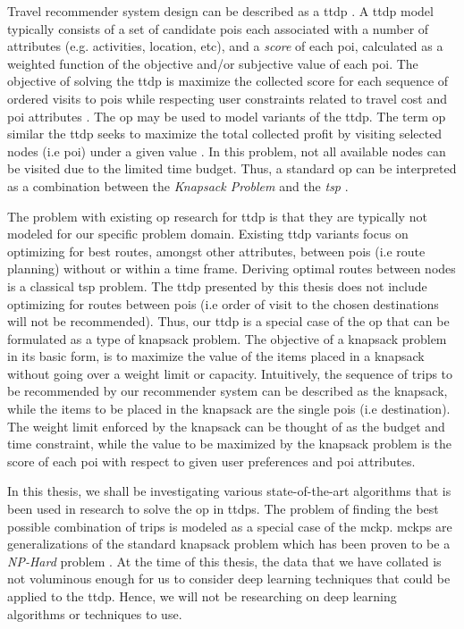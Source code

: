 Travel recommender system design can be described as a \gls{ttdp} \parencite{Vansteenwegen2007TheOpportunity}. A \gls{ttdp} model typically consists of a set of candidate \glspl{poi} each associated with a number of attributes (e.g. activities, location, etc), and a \textit{score} of each \gls{poi}, calculated as a weighted function of the objective and/or subjective value of each \gls{poi}. The objective of solving the \gls{ttdp} is maximize the collected score for each sequence of ordered visits to \glspl{poi} while respecting user constraints related to travel cost and \gls{poi} attributes \parencite{Survey_TTDP_Guavalas}. The \gls{op} may be used to model variants of the \gls{ttdp}. The term \gls{op} similar the \gls{ttdp} seeks to maximize the total collected profit by visiting selected nodes (i.e \gls{poi}) under a given value \parencite{T.1984HeuristicOrienteering}. In this problem, not all available nodes can be visited due to the limited time budget. Thus, a standard \gls{op} can be interpreted as a combination between the \textit{Knapsack Problem} and the \textit{tsp} \parencite{OP_Solution_Gunawan}. 

The problem with existing \gls{op} research for \gls{ttdp} is that they are typically not modeled for our specific problem domain. Existing \gls{ttdp} variants focus on optimizing for best routes, amongst other attributes, between \glspl{poi} (i.e route planning) without or within a time frame. Deriving optimal routes between nodes is a classical \gls{tsp} problem. The \gls{ttdp} presented by this thesis does not include optimizing for routes between \glspl{poi} (i.e order of visit to the chosen destinations will not be recommended). Thus, our \gls{ttdp} is a special case of the \gls{op} that can be formulated as a type of knapsack problem. The objective of a knapsack problem in its basic form, is to maximize the value of the items placed in a knapsack without going over a weight limit or capacity. Intuitively, the sequence of trips to be recommended by our recommender system can be described as the knapsack, while the items to be placed in the knapsack are the single \glspl{poi} (i.e destination). The weight limit enforced by the knapsack can be thought of as the budget and time constraint, while the value to be maximized by the knapsack problem is the score of each \gls{poi} with respect to given user preferences and \gls{poi} attributes.

In this thesis, we shall be investigating various state-of-the-art algorithms that is been used in research to solve the \gls{op} in \glspl{ttdp}. The problem of finding the best possible combination of trips is modeled as a special case of the \gls{mckp}. \Glspl{mckp} are generalizations of the standard knapsack problem which has been proven to be a \textit{NP-Hard} problem \parencite{Kellerer2004TheProblem}. At the time of this thesis, the data that we have collated is not voluminous enough for us to consider deep learning techniques that could be applied to the \gls{ttdp}. Hence, we will not be researching on deep learning algorithms or techniques to use.

